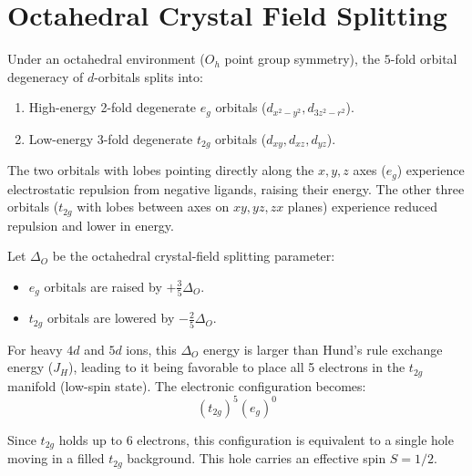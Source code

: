 \documentclass[11pt,a4paper]{article}
\begin{document}
\section{Octahedral Crystal Field Splitting}

Under an octahedral environment ($O_h$ point group symmetry), the $5$-fold orbital degeneracy of $d$-orbitals splits into:
\begin{enumerate}
    \item High-energy 2-fold degenerate $e_g$ orbitals ($d_{x^2-y^2}, d_{3z^2-r^2}$).
    \item Low-energy 3-fold degenerate $t_{2g}$ orbitals ($d_{xy}, d_{xz}, d_{yz}$).
\end{enumerate}

The two orbitals with lobes pointing directly along the $x, y, z$ axes ($e_g$) experience electrostatic repulsion from negative ligands, raising their energy. The other three orbitals ($t_{2g}$ with lobes between axes on $xy, yz, zx$ planes) experience reduced repulsion and lower in energy.

Let $\Delta_O$ be the octahedral crystal-field splitting parameter:
\begin{itemize}
    \item $e_g$ orbitals are raised by $+\frac{3}{5}\Delta_O$.
    \item $t_{2g}$ orbitals are lowered by $-\frac{2}{5}\Delta_O$.
\end{itemize}

For heavy $4d$ and $5d$ ions, this $\Delta_O$ energy is larger than Hund's rule exchange energy ($J_H$), leading to it being favorable to place all 5 electrons in the $t_{2g}$ manifold (low-spin state). The electronic configuration becomes:
\begin{equation}
    (t_{2g})^5 (e_g)^0
\end{equation}

Since $t_{2g}$ holds up to 6 electrons, this configuration is equivalent to a single hole moving in a filled $t_{2g}$ background. This hole carries an effective spin $S = 1/2$.
\end{document}
